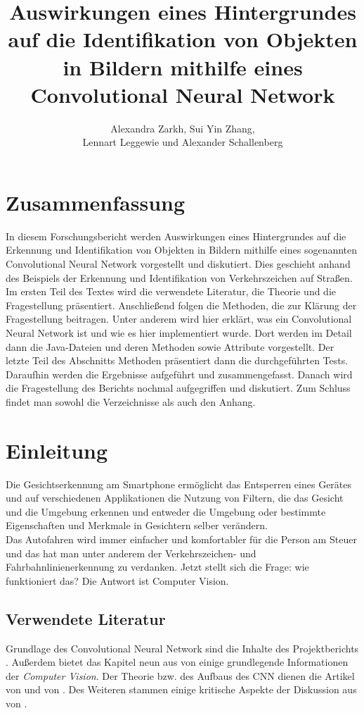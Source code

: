 \documentclass[paper=A4,pagesize=auto,12pt,headinclude=true,footinclude=true,BCOR=0mm,DIV=calc]{scrartcl}
\title{Auswirkungen eines Hintergrundes auf die Identifikation von Objekten in Bildern mithilfe eines Convolutional Neural Network}
\author{Alexandra Zarkh, Sui Yin Zhang,\\ Lennart Leggewie und Alexander Schallenberg}
\newcommand{\sectionspace}{
	\vspace{0.5cm}
}
\begin{document}
\begin{titlepage}
	\maketitle
\end{titlepage}

\tableofcontents
\newpage


\section{Zusammenfassung}\label{sec:Zusammenfassung}
In diesem Forschungsbericht werden Auswirkungen eines Hintergrundes auf die Erkennung und Identifikation von Objekten in Bildern mithilfe eines sogenannten Convolutional Neural Network vorgestellt und diskutiert. Dies geschieht anhand des Beispiels der Erkennung und Identifikation von Verkehrszeichen auf Straßen.\\
Im ersten Teil des Textes wird die verwendete Literatur, die Theorie und die Fragestellung präsentiert. Anschließend folgen die Methoden, die zur Klärung der Fragestellung beitragen. Unter anderem wird hier erklärt, was ein Convolutional Neural Network ist und wie es hier implementiert wurde. Dort werden im Detail dann die Java-Dateien und deren Methoden sowie Attribute vorgestellt. Der letzte Teil des Abschnitts Methoden präsentiert dann die durchgeführten Tests.
Daraufhin werden die Ergebnisse aufgeführt und zusammengefasst. Danach wird die Fragestellung des Berichts nochmal aufgegriffen und diskutiert. Zum Schluss findet man sowohl die Verzeichnisse als auch den Anhang.

\sectionspace
\section{Einleitung}\label{sec:Einleitung} %
Die Gesichtserkennung am Smartphone ermöglicht das Entsperren eines Gerätes und auf verschiedenen Applikationen die Nutzung von Filtern, die das Gesicht und die Umgebung erkennen und entweder die Umgebung oder bestimmte Eigenschaften und Merkmale in Gesichtern selber verändern.\\
Das Autofahren wird immer einfacher und komfortabler für die Person am Steuer und das hat man unter anderem der Verkehrszeichen- und Fahrbahnlinienerkennung zu verdanken. Jetzt stellt sich die Frage: wie funktioniert das? Die Antwort ist Computer Vision.

\subsection{Verwendete Literatur}\label{sec:VerwendeteLiteratur}
Grundlage des Convolutional Neural Network sind die Inhalte des Projektberichts \cite{projektbericht}. Außerdem bietet das Kapitel neun aus  von \citeauthor{script} \cite{script} einige grundlegende Informationen der \textit{Computer Vision}. Der Theorie bzw. des Aufbaus des CNN dienen die Artikel  von \citeauthor{cnn1} \cite{cnn1} und  von \citeauthor{cnn2} \cite{cnn2}. Des Weiteren stammen einige kritische Aspekte der Diskussion aus  von \citeauthor{discuss1} \cite{discuss1}. 
\end{document}
